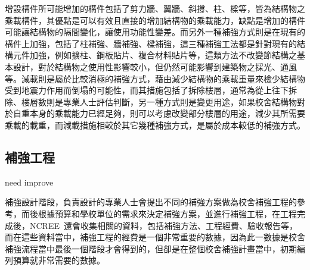 增設構件所可能增加的構件包括了剪力牆、翼牆、斜撐、柱、樑等，皆為結構物之乘載構件，其優點是可以有效且直接的增加結構物的乘載能力，缺點是增加的構件可能讓結構物的隔間變化，讓使用功能性變差。而另外一種補強方式則是在現有的構件上加強，包括了柱補強、牆補強、樑補強，這三種補強工法都是針對現有的結構元件加強，例如擴柱、鋼板貼片、複合材料貼片等，這類方法不改變節結構之基本設計，對於結構物之使用性影響較小，但仍然可能影響到建築物之採光、通風等。減載則是屬於比較消極的補強方式，藉由減少結構物的乘載重量來檢少結構物受到地震力作用而倒塌的可能性，而其措施包括了拆除樓層，通常為從上往下拆除、樓層數則是專業人士評估判斷，另一種方式則是變更用途，如果校舍結構物對於自重本身的乘載能力已經足夠，則可以考慮改變部分樓層的用途，減少其所需要乘載的載重，而減載措施相較於其它幾種補強方式，是屬於成本較低的補強方式。


\subsection{補強工程}

need improve

補強設計階段，負責設計的專業人士會提出不同的補強方案做為校舍補強工程的參考，而後根據預算和學校單位的需求來決定補強方案，並進行補強工程，在工程完成後，NCREE~還會收集相關的資料，包括補強方法、工程經費、驗收報告等，而在這些資料當中，補強工程的經費是一個非常重要的數據，因為此一數據是校舍補強流程當中最後一個階段才會得到的，但卻是在整個校舍補強計畫當中，初期編列預算就非常需要的數據。



